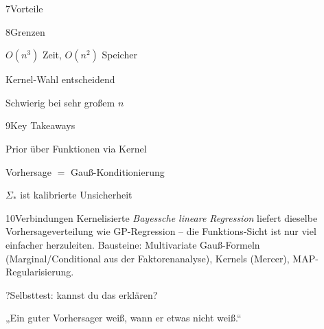 \begin{hngrid}
\begin{hnp}[raster multicolumn=2,acc=hngreen]{7}{Vorteile}
\begin{hnpro}
\end{hnpro}
\end{hnp}
%
\begin{hnp}[raster multicolumn=2,acc=hnred]{8}{Grenzen}
\begin{hncon}
\item $O(n^3)$ Zeit, $O(n^2)$ Speicher
\item Kernel-Wahl entscheidend
\item Schwierig bei sehr großem $n$
\end{hncon}
\end{hnp}
%
\begin{hnp}[raster multicolumn=2,acc=hnorange]{9}{Key Takeaways}
\begin{hnchk}
\item Prior über Funktionen via Kernel
\item Vorhersage $=$ Gauß-Konditionierung
\item $\Sigma_*$ ist kalibrierte Unsicherheit
\end{hnchk}
\end{hnp}
%
\begin{hnp}[raster multicolumn=6,acc=hnteal]{10}{Verbindungen}
Kernelisierte \emph{Bayessche lineare Regression} liefert dieselbe Vorhersageverteilung wie GP-Regression -- die Funktions-Sicht ist nur viel einfacher herzuleiten. Bausteine: Multivariate Gauß-Formeln (Marginal/Conditional aus der Faktorenanalyse), Kernels (Mercer), MAP-Regularisierung.
\end{hnp}
%
\begin{hnp}[raster multicolumn=6,acc=hnpurple,colback=hnlilac!30]{?}{Selbsttest: kannst du das erklären?}
\end{hnp}
%
\begin{hnbanner}[raster multicolumn=6]
„Ein guter Vorhersager weiß, wann er etwas nicht weiß.“
\end{hnbanner}
\end{hngrid}
